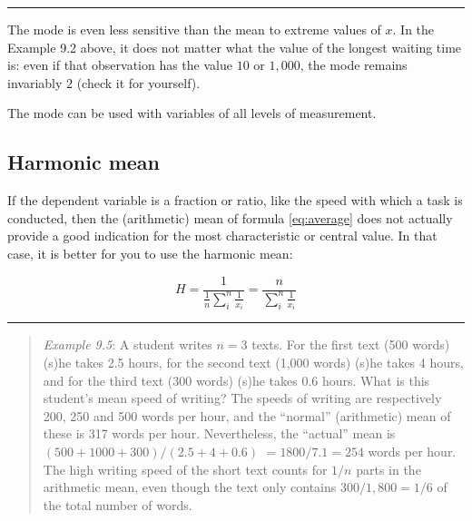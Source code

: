 \documentclass[
]{book}
\begin{document}
\begin{center}\rule{0.5\linewidth}{0.5pt}\end{center}

The mode is even less sensitive than the mean to extreme values of
\(x\). In the Example 9.2 above, it does not matter what the value of
the longest waiting time is: even if that observation has the value \(10\) or
\(1,000\), the mode remains invariably \(2\) (check it for yourself).

The mode can be used with variables of all levels of measurement.

\hypertarget{sec:harmonicmean}{%
\subsection{Harmonic mean}\label{sec:harmonicmean}}

If the dependent variable is a fraction or ratio,
like the speed with which a task is conducted, then
the (arithmetic) mean of formula \eqref{eq:average} does
not actually provide a good indication for the
most characteristic or central value. In that case, it is better
for you to use the harmonic mean:

\begin{equation}
  H = \frac{1}{\frac{1}{n} \sum\limits_{i}^n \frac{1}{x_i} } = \frac{n}{\sum\limits_{i}^n \frac{1}{x_i}}
  \label{eq:harmonicmean}
\end{equation}

\begin{center}\rule{0.5\linewidth}{0.5pt}\end{center}

\begin{quote}
\emph{Example 9.5}:
A student writes \(n=3\) texts. For the first text (500 words) (s)he takes
2.5 hours, for the second text (1,000 words) (s)he takes 4 hours, and
for the third text (300 words) (s)he takes 0.6 hours. What is this student's
mean speed of writing? The speeds of writing are respectively 200, 250 and 500
words per hour, and the ``normal'' (arithmetic) mean of these is
317 words per hour. Nevertheless, the ``actual'' mean is
\((500+1000+300)/(2.5+4+0.6)\) \(=1800/7.1=254\) words per hour. The high
writing speed of the short text counts for \(1/n\) parts in the arithmetic
mean, even though the text only contains \(300/1,800=1/6\)
of the total number of words.
\end{quote}
\end{document}
